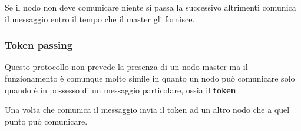 Se il nodo non deve comunicare niente si passa la successivo altrimenti
comunica il messaggio entro il tempo che il master gli fornisce.

\subsubsection{Token passing}
Questo protocollo non prevede la presenza di un nodo master ma il 
funzionamento è comunque molto simile in quanto un nodo può comunicare
solo quando è in possesso di un messaggio particolare, ossia il 
\textbf{token}.

Una volta che comunica il messaggio invia il token ad un altro nodo
che a quel punto può comunicare.


